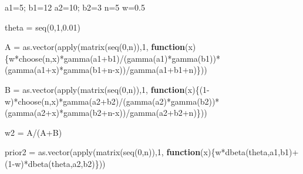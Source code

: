 \documentclass[
]{book}
\newenvironment{Shaded}{\begin{snugshade}}{\end{snugshade}}
\newcommand{\ControlFlowTok}[1]{\textcolor[rgb]{0.13,0.29,0.53}{\textbf{#1}}}
\newcommand{\DecValTok}[1]{\textcolor[rgb]{0.00,0.00,0.81}{#1}}
\newcommand{\FloatTok}[1]{\textcolor[rgb]{0.00,0.00,0.81}{#1}}
\newcommand{\FunctionTok}[1]{\textcolor[rgb]{0.00,0.00,0.00}{#1}}
\newcommand{\NormalTok}[1]{#1}
\newcommand{\OtherTok}[1]{\textcolor[rgb]{0.56,0.35,0.01}{#1}}
\newcommand{\SpecialCharTok}[1]{\textcolor[rgb]{0.00,0.00,0.00}{#1}}
\begin{document}
\begin{Shaded}
\begin{Highlighting}[]
\NormalTok{a1}\OtherTok{=}\DecValTok{5}\NormalTok{; b1}\OtherTok{=}\DecValTok{12}
\NormalTok{a2}\OtherTok{=}\DecValTok{10}\NormalTok{; b2}\OtherTok{=}\DecValTok{3} 
\NormalTok{n}\OtherTok{=}\DecValTok{5}
\NormalTok{w}\OtherTok{=}\FloatTok{0.5}

\NormalTok{theta }\OtherTok{=} \FunctionTok{seq}\NormalTok{(}\DecValTok{0}\NormalTok{,}\DecValTok{1}\NormalTok{,}\FloatTok{0.01}\NormalTok{)}

\NormalTok{A }\OtherTok{=} \FunctionTok{as.vector}\NormalTok{(}\FunctionTok{apply}\NormalTok{(}\FunctionTok{matrix}\NormalTok{(}\FunctionTok{seq}\NormalTok{(}\DecValTok{0}\NormalTok{,n)),}\DecValTok{1}\NormalTok{,}
  \ControlFlowTok{function}\NormalTok{(x)\{w}\SpecialCharTok{*}\FunctionTok{choose}\NormalTok{(n,x)}\SpecialCharTok{*}\FunctionTok{gamma}\NormalTok{(a1}\SpecialCharTok{+}\NormalTok{b1)}\SpecialCharTok{/}\NormalTok{(}\FunctionTok{gamma}\NormalTok{(a1)}\SpecialCharTok{*}\FunctionTok{gamma}\NormalTok{(b1))}\SpecialCharTok{*}
\NormalTok{    (}\FunctionTok{gamma}\NormalTok{(a1}\SpecialCharTok{+}\NormalTok{x)}\SpecialCharTok{*}\FunctionTok{gamma}\NormalTok{(b1}\SpecialCharTok{+}\NormalTok{n}\SpecialCharTok{{-}}\NormalTok{x))}\SpecialCharTok{/}\FunctionTok{gamma}\NormalTok{(a1}\SpecialCharTok{+}\NormalTok{b1}\SpecialCharTok{+}\NormalTok{n)\}))}

\NormalTok{B }\OtherTok{=} \FunctionTok{as.vector}\NormalTok{(}\FunctionTok{apply}\NormalTok{(}\FunctionTok{matrix}\NormalTok{(}\FunctionTok{seq}\NormalTok{(}\DecValTok{0}\NormalTok{,n)),}\DecValTok{1}\NormalTok{,}
  \ControlFlowTok{function}\NormalTok{(x)\{(}\DecValTok{1}\SpecialCharTok{{-}}\NormalTok{w)}\SpecialCharTok{*}\FunctionTok{choose}\NormalTok{(n,x)}\SpecialCharTok{*}\FunctionTok{gamma}\NormalTok{(a2}\SpecialCharTok{+}\NormalTok{b2)}\SpecialCharTok{/}\NormalTok{(}\FunctionTok{gamma}\NormalTok{(a2)}\SpecialCharTok{*}\FunctionTok{gamma}\NormalTok{(b2))}\SpecialCharTok{*}
\NormalTok{    (}\FunctionTok{gamma}\NormalTok{(a2}\SpecialCharTok{+}\NormalTok{x)}\SpecialCharTok{*}\FunctionTok{gamma}\NormalTok{(b2}\SpecialCharTok{+}\NormalTok{n}\SpecialCharTok{{-}}\NormalTok{x))}\SpecialCharTok{/}\FunctionTok{gamma}\NormalTok{(a2}\SpecialCharTok{+}\NormalTok{b2}\SpecialCharTok{+}\NormalTok{n)\}))}

\NormalTok{w2 }\OtherTok{=}\NormalTok{ A}\SpecialCharTok{/}\NormalTok{(A}\SpecialCharTok{+}\NormalTok{B)}

\NormalTok{prior2 }\OtherTok{=} \FunctionTok{as.vector}\NormalTok{(}\FunctionTok{apply}\NormalTok{(}\FunctionTok{matrix}\NormalTok{(}\FunctionTok{seq}\NormalTok{(}\DecValTok{0}\NormalTok{,n)),}\DecValTok{1}\NormalTok{,}
  \ControlFlowTok{function}\NormalTok{(x)\{w}\SpecialCharTok{*}\FunctionTok{dbeta}\NormalTok{(theta,a1,b1)}\SpecialCharTok{+}
\NormalTok{              (}\DecValTok{1}\SpecialCharTok{{-}}\NormalTok{w)}\SpecialCharTok{*}\FunctionTok{dbeta}\NormalTok{(theta,a2,b2)\}))}
                        

\end{Highlighting}
\end{Shaded}
\end{document}

